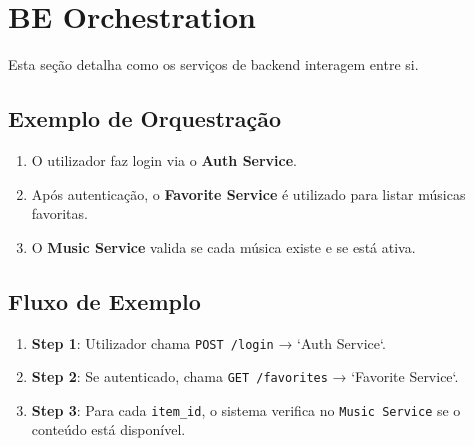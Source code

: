 \documentclass[a4paper,12pt]{article}
\begin{document}
\clearpage %

\section{BE Orchestration}
Esta seção detalha como os serviços de backend interagem entre si.

\subsection{Exemplo de Orquestração}
\begin{enumerate}
    \item O utilizador faz login via o \textbf{Auth Service}.
    \item Após autenticação, o \textbf{Favorite Service} é utilizado para listar músicas favoritas.
    \item O \textbf{Music Service} valida se cada música existe e se está ativa.
\end{enumerate}

\subsection{Fluxo de Exemplo}
\begin{enumerate}
    \item \textbf{Step 1}: Utilizador chama \texttt{POST /login} → `Auth Service`.  
    \item \textbf{Step 2}: Se autenticado, chama \texttt{GET /favorites} → `Favorite Service`.  
    \item \textbf{Step 3}: Para cada \texttt{item\_id}, o sistema verifica no \texttt{Music Service} se o conteúdo está disponível.  
\end{enumerate}
\end{document}
